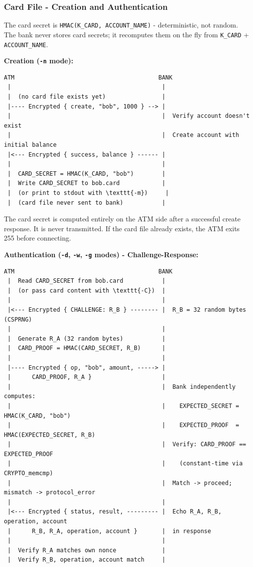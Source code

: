 \documentclass[
]{article}
\begin{document}
\hypertarget{card-file---creation-and-authentication}{%
\subsubsection{Card File - Creation and
Authentication}\label{card-file---creation-and-authentication}}

The card secret is \texttt{HMAC(K\_CARD,\ ACCOUNT\_NAME)} -
deterministic, not random. The bank never stores card secrets; it
recomputes them on the fly from \texttt{K\_CARD} + \texttt{ACCOUNT\_NAME}.

\textbf{Creation (\texttt{-n} mode):}

\begin{verbatim}
ATM                                         BANK
 |                                           |
 |  (no card file exists yet)                |
 |---- Encrypted { create, "bob", 1000 } --> |
 |                                           |  Verify account doesn't exist
 |                                           |  Create account with initial balance
 |<--- Encrypted { success, balance } ------ |
 |                                           |
 |  CARD_SECRET = HMAC(K_CARD, "bob")        |
 |  Write CARD_SECRET to bob.card            |
 |  (or print to stdout with \texttt{-m})     |
 |  (card file never sent to bank)           |
\end{verbatim}

The card secret is computed entirely on the ATM side after a successful
create response. It is never transmitted. If the card file already
exists, the ATM exits 255 before connecting.

\newpage
\textbf{Authentication (\texttt{-d}, \texttt{-w}, \texttt{-g} modes) -
Challenge-Response:}

\begin{verbatim}
ATM                                         BANK
 |  Read CARD_SECRET from bob.card           |
 |  (or pass card content with \texttt{-C})  |
 |                                           |
 |<--- Encrypted { CHALLENGE: R_B } -------- |  R_B = 32 random bytes (CSPRNG)
 |                                           |
 |  Generate R_A (32 random bytes)           |
 |  CARD_PROOF = HMAC(CARD_SECRET, R_B)      |
 |                                           |
 |---- Encrypted { op, "bob", amount, -----> |
 |      CARD_PROOF, R_A }                    |
 |                                           |  Bank independently computes:
 |                                           |    EXPECTED_SECRET = HMAC(K_CARD, "bob")
 |                                           |    EXPECTED_PROOF  = HMAC(EXPECTED_SECRET, R_B)
 |                                           |  Verify: CARD_PROOF == EXPECTED_PROOF
 |                                           |    (constant-time via CRYPTO_memcmp)
 |                                           |  Match -> proceed; mismatch -> protocol_error
 |                                           |
 |<--- Encrypted { status, result, --------- |  Echo R_A, R_B, operation, account
 |      R_B, R_A, operation, account }       |  in response
 |                                           |
 |  Verify R_A matches own nonce             |
 |  Verify R_B, operation, account match     |
\end{verbatim}
\end{document}
